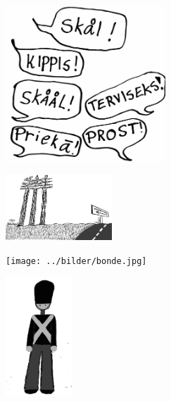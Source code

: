 %

\begin{intersong}
\sffamily\bfseries\LARGE{}
\begin{center}
\includegraphics[width=6cm]{../bilder/fardigabilder/BilderTillKapitel/skal.png} 
\end{center}
\end{intersong}
\sclearpage

\sclearpage


\begin{intersong}
\begin{center}
\includegraphics[width=4cm]{../bilder/fardigabilder/CamillasFardigaBilder/Norrlandsdjupaskogar2.png} 
\end{center}
\end{intersong}
\sclearpage

\sclearpage


\begin{intersong}
\begin{center}
\texttt{[image: ../bilder/bonde.jpg]} 
\end{center}
\end{intersong}
\sclearpage


\sclearpage

\sclearpage

\sclearpage


\begin{intersong}
\begin{center}
\includegraphics[width=25mm]{../bilder/fardigabilder/CamillasFardigaBilder/EnDanskAquavit2.png} 
\end{center}
\end{intersong}
